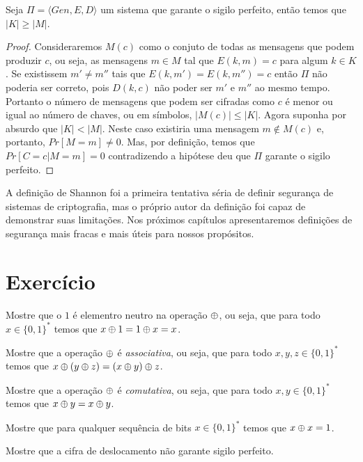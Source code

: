 \begin{theorem}[Shannon]
Seja $\Pi = \langle Gen, E, D \rangle$ um sistema que garante o sigilo perfeito, então temos que $|K| \geq |M|$.  
\end{theorem}
\begin{proof}
  Consideraremos $M(c)$ como o conjuto de todas as mensagens que podem produzir $c$, ou seja, as mensagens $m \in M$ tal que $E(k, m) = c$ para algum $k \in K$.
  Se existissem $m' \neq m''$ tais que $E(k, m') = E(k, m'') = c$ então $\Pi$ não poderia ser correto, pois $D(k, c)$ não poder ser $m'$ e $m''$ ao mesmo tempo. 
  Portanto o número de mensagens que podem ser cifradas como $c$ é menor ou igual ao número de chaves, ou em símbolos, $|M(c)| \leq |K|$.
  Agora suponha por absurdo que $|K| < |M|$.
  Neste caso existiria uma mensagem $m \notin M(c)$ e, portanto, $Pr[M = m] \neq 0$.
  Mas, por definição, temos que $Pr[C = c | M = m] = 0$ contradizendo a hipótese deu que $\Pi$ garante o sigilo perfeito. 
\end{proof}

A definição de Shannon foi a primeira tentativa séria de definir segurança de sistemas de criptografia, mas o próprio autor da definição foi capaz de demonstrar suas limitações.
Nos próximos capítulos apresentaremos definições de segurança mais fracas e mais úteis para nossos propósitos.

\section{Exercício}
\label{sec:exercicio}

\begin{exercicio}
  Mostre que o $1$ é elementro neutro na operação $\oplus$, ou seja, que para todo $x \in \{0,1\}^*$ temos que $x \oplus 1 = 1 \oplus x = x$.
\end{exercicio}

\begin{exercicio}
  Mostre que a operação $\oplus$ é {\em associativa}, ou seja, que para todo $x,y,z \in \{0,1\}^*$ temos que $x \oplus (y \oplus z) = (x \oplus y) \oplus z$.
\end{exercicio}

\begin{exercicio}
  Mostre que a operação $\oplus$ é {\em comutativa}, ou seja, que para todo $x,y \in \{0,1\}^*$ temos que $x \oplus y = x \oplus y$.
\end{exercicio}

\begin{exercicio}
  Mostre que para qualquer sequência de bits $x \in \{0,1\}^*$ temos que $x \oplus x = 1$.
\end{exercicio}

\begin{exercicio}
  Mostre que a cifra de deslocamento não garante sigilo perfeito.
\end{exercicio}

